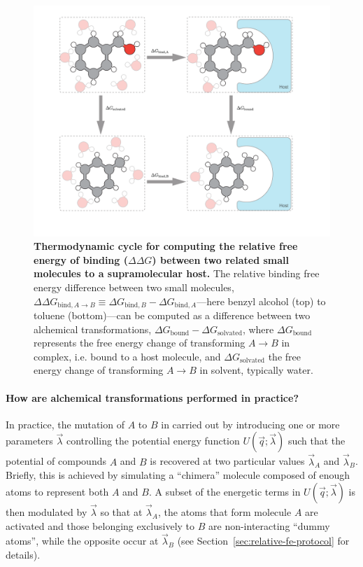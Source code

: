 \documentclass[9pt,bestpractices]{livecoms}
\begin{document}
\begin{figure}
    \includegraphics[width=0.95\linewidth]{figures/fig2_therm_cyc/Figure.pdf}
    \caption{{\bf Thermodynamic cycle for computing the relative free energy of binding ($\Delta \Delta G$) between two related small molecules to a supramolecular host.}
    The relative binding free energy difference between two small molecules, $\Delta \Delta G_{\mathrm{bind}, A \rightarrow B} \equiv \Delta G_{\mathrm{bind}, B} - \Delta G_{\mathrm{bind}, A}$---here benzyl alcohol (top) to toluene (bottom)---can be computed as a difference between two alchemical transformations, $\Delta G_\mathrm{bound} - \Delta G_\mathrm{solvated}$, where $\Delta G_\mathrm{bound}$ represents the free energy change of transforming $A \rightarrow B$ in complex, i.e. bound to a host molecule, and $\Delta G_\mathrm{solvated}$ the free energy change of transforming $A \rightarrow B$ in solvent, typically water.}
    \label{fig:fig_binding_thermodynamic_cycle}
\end{figure}

\paragraph{How are alchemical transformations performed in practice?}

In practice, the mutation of $A$ to $B$ in carried out by introducing one or more parameters $\vec{\lambda}$ controlling the potential energy function $U(\vec{q};\vec{\lambda})$ such that the potential of compounds $A$ and $B$ is recovered at two particular values $\vec{\lambda}_A$ and $\vec{\lambda}_B$.
Briefly, this is achieved by simulating a ``chimera'' molecule composed of enough atoms to represent both $A$ and $B$.
A subset of the energetic terms in $U(\vec{q};\vec{\lambda})$ is then modulated by $\vec{\lambda}$ so that at $\vec{\lambda}_A$, the atoms that form molecule $A$ are activated and those belonging exclusively to $B$ are non-interacting ``dummy atoms'', while the opposite occur at $\vec{\lambda}_B$ (see Section~\ref{sec:relative-fe-protocol} for details).
\end{document}
